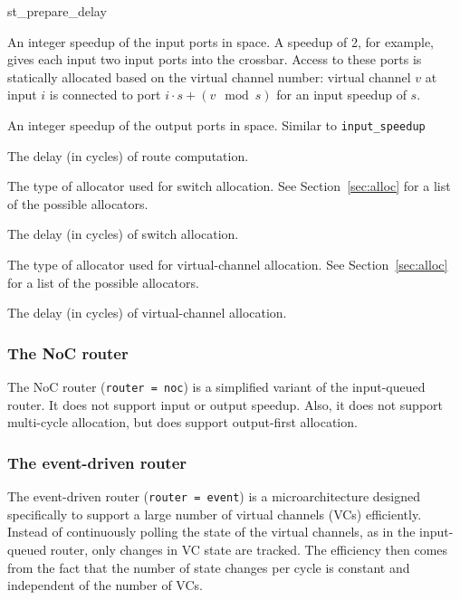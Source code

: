 \documentclass[11pt]{article}
\begin{document}
\begin{opt_list}{st\_prepare\_delay}

\item[input\_speedup] An integer speedup of the input ports in space.
A speedup of 2, for example, gives each input two input ports into the
crossbar.  Access to these ports is statically allocated based on the
virtual channel number: virtual channel $v$ at input $i$ is connected
to port $i \cdot s + (v \mod s)$ for an input speedup of $s$.

\item[output\_speedup] An integer speedup of the output ports in
space.  Similar to \texttt{input\_speedup}

\item[routing\_delay] The delay (in cycles) of route computation.

\item[sw\_allocator] The type of allocator used for switch allocation.
See Section~\ref{sec:alloc} for a list of the possible allocators.

\item[sw\_alloc\_delay] The delay (in cycles) of switch allocation.

\item[vc\_allocator] The type of allocator used for virtual-channel
allocation.  See Section~\ref{sec:alloc} for a list of the possible
allocators.

\item[vc\_alloc\_delay] The delay (in cycles) of virtual-channel
allocation.


\end{opt_list}


\subsubsection{The NoC router}
\label{sec:noc_router}

The NoC router (\texttt{router = noc}) is a simplified variant of the input-queued router. It does not support input or output speedup. Also, it does not support multi-cycle allocation, but does support output-first allocation.




\subsubsection{The event-driven router}
\label{sec:event_router}

The event-driven router (\texttt{router = event}) is a
microarchitecture designed specifically to support a large number of
virtual channels (VCs) efficiently.  Instead of continuously polling
the state of the virtual channels, as in the input-queued router, only
changes in VC state are tracked.  The efficiency then comes from the
fact that the number of state changes per cycle is constant and
independent of the number of VCs.
\end{document}
